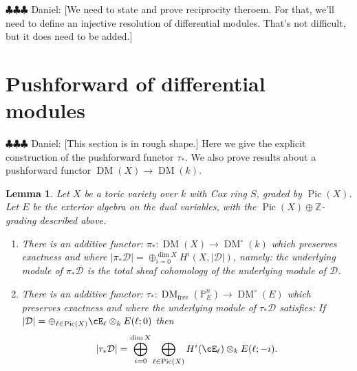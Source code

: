 \documentclass[12pt]{amsart}
\newtheorem{lemma}{Lemma}[section]
\theoremstyle{definition}
\theoremstyle{remark}
\newcommand{\PP}{\mathbb P}
\newcommand{\ZZ}{\mathbb Z}
\newcommand{\Pic}{\operatorname{Pic}}
\newcommand{\daniel}[1]{{\color{blue} \sf $\clubsuit\clubsuit\clubsuit$ Daniel: [#1]}}
\def\DM{\operatorname{DM}}
\def\free{\operatorname{free}}
\begin{document}
\daniel{We need to state and prove reciprocity theroem.  For that, we'll need to define an injective resolution of differential modules.  That's not difficult, but it does need to be added.}



\section{Pushforward of differential modules}\label{sec:tau}
\daniel{This section is in rough shape.}
Here we give the explicit construction of the pushforward functor $\tau_*$.  We also prove results about a pushforward functor $\DM(X)\to \DM(k)$.
\begin{lemma}\label{lemma:tau}
Let $X$ be a toric variety over $k$ with Cox ring $S$, graded by $\Pic(X)$.  Let $E$ be the exterior algebra on the dual variables, with the $\Pic(X)\oplus \ZZ$-grading described above.
\begin{enumerate}
	\item There is an additive functor: $\pi_*\colon \DM(X)\to \DM^\circ (k)$ which preserves exactness and where $|\pi_* \mathcal D| =\oplus_{i=0}^{\dim X} H^i(X, |\mathcal D|)$, namely: the underlying module of $\pi_* \mathcal D$ is the total sheaf cohomology of the underlying module of $\mathcal D$.
	\item There is an additive functor: $\tau_*\colon \DM_{\free}(\PP^n_E)\to \DM^\circ(E)$ which preserves exactness and where the underlying module of $\tau_*\mathcal D$ satisfies: If $|\mathcal D| =\oplus_{\ell\in \Pic(X)} \cE_\ell\otimes_k E(\ell;0)$ then
	\begin{equation}\label{eqn:underlying module}
	 |\tau_*\mathcal D| =\bigoplus_{i=0}^{\dim X}\bigoplus_{\ell\in \Pic(X)} H^i(\cE_\ell)\otimes_k E(\ell;-i).
	 \end{equation}
	\end{enumerate}
\end{lemma}
\end{document}
